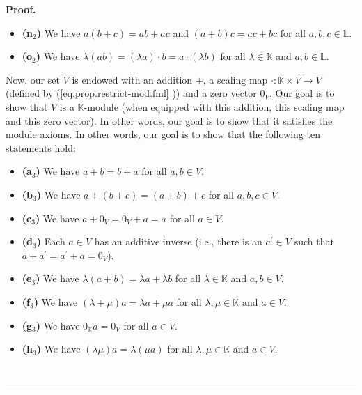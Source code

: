 \documentclass[numbers=enddot,12pt,final,onecolumn,notitlepage]{scrartcl}%
\theoremstyle{definition}
\newenvironment{fineprint}{\begin{small}}{\end{small}}
\newenvironment{proof}[1][Proof]{\noindent\textbf{#1.} }{\ \rule{0.5em}{0.5em}}
\begin{document}
\begin{fineprint}
\begin{proof}
\begin{itemize}
\item \textbf{(n}$_{2}$\textbf{)} We have $a\left(  b+c\right)  =ab+ac$ and
$\left(  a+b\right)  c=ac+bc$ for all $a,b,c\in\mathbb{L}$.

\item \textbf{(o}$_{2}$\textbf{)} We have $\lambda\left(  ab\right)  =\left(
\lambda a\right)  \cdot b=a\cdot\left(  \lambda b\right)  $ for all
$\lambda\in\mathbb{K}$ and $a,b\in\mathbb{L}$.
\end{itemize}

Now, our set $V$ is endowed with an addition $+$, a scaling map $\cdot
:\mathbb{K}\times V\rightarrow V$ (defined by (\ref{eq.prop.restrict-mod.fml}%
)) and a zero vector $0_{V}$. Our goal is to show that $V$ is a $\mathbb{K}%
$-module (when equipped with this addition, this scaling map and this zero
vector). In other words, our goal is to show that it satisfies the module
axioms. In other words, our goal is to show that the following ten statements hold:

\begin{itemize}
\item \textbf{(a}$_{3}$\textbf{)} We have $a+b=b+a$ for all $a,b\in V$.

\item \textbf{(b}$_{3}$\textbf{)} We have $a+\left(  b+c\right)  =\left(
a+b\right)  +c$ for all $a,b,c\in V$.

\item \textbf{(c}$_{3}$\textbf{)} We have $a+0_{V}=0_{V}+a=a$ for all $a\in V$.

\item \textbf{(d}$_{3}$\textbf{)} Each $a\in V$ has an additive inverse (i.e.,
there is an $a^{\prime}\in V$ such that $a+a^{\prime}=a^{\prime}+a=0_{V}$).

\item \textbf{(e}$_{3}$\textbf{)} We have $\lambda\left(  a+b\right)  =\lambda
a+\lambda b$ for all $\lambda\in\mathbb{K}$ and $a,b\in V$.

\item \textbf{(f}$_{3}$\textbf{)} We have $\left(  \lambda+\mu\right)
a=\lambda a+\mu a$ for all $\lambda,\mu\in\mathbb{K}$ and $a\in V$.

\item \textbf{(g}$_{3}$\textbf{)} We have $0_{\mathbb{K}}a=0_{V}$ for all
$a\in V$.

\item \textbf{(h}$_{3}$\textbf{)} We have $\left(  \lambda\mu\right)
a=\lambda\left(  \mu a\right)  $ for all $\lambda,\mu\in\mathbb{K}$ and $a\in
V$.


\end{itemize}
\end{proof}
\end{fineprint}
\end{document}
